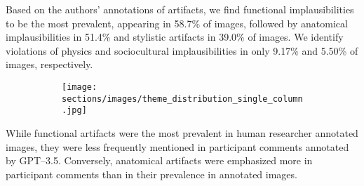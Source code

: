 Based on the authors' annotations of artifacts, we find functional implausibilities to be the most prevalent, appearing in 58.7\% of images, followed by anatomical implausibilities in 51.4\% and stylistic artifacts in 39.0\% of images. We identify violations of physics and sociocultural implausibilities in only 9.17\% and 5.50\% of images, respectively. 
\begin{figure}[H]
\centering
\captionsetup{justification=raggedright, singlelinecheck=false, skip=2pt}
\begin{subfigure}[t]{0.9\linewidth}
    \texttt{[image: sections/images/theme\_distribution\_single\_column.jpg]}
\end{subfigure}
\caption{}
\label{fig:themes}
\end{figure}
While functional artifacts were the most prevalent in human researcher annotated images, they were less frequently mentioned in participant comments annotated by GPT--3.5. Conversely, anatomical artifacts were emphasized more in participant comments than in their prevalence in annotated images. 

